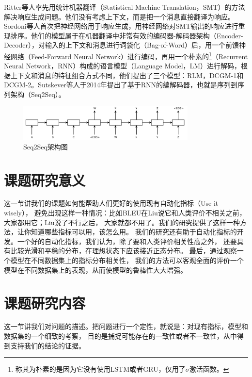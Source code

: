 Ritter等人率先用统计机器翻译（Statistical Machine Translation，SMT）的方法解决响应生成问题。他们没有考虑上下文，而是把一个消息直接翻译为响应。Sordoni等人首次把神经网络用于响应生成，用神经网络对SMT输出的响应进行重现排序。他们的模型属于在机器翻译中非常有效的编码器-解码器架构（Encoder-Decoder），对输入的上下文和消息进行词袋化（Bag-of-Word）后，用一个前馈神经网络（Feed-Forward Neural Network）进行编码，再用一个朴素的\footnote{称其为朴素的是因为它没有使用LSTM或者GRU，仅用了$\sigma$激活函数。}（Recurrent Neural Network，RNN）构成的语言模型（Language Model，LM）进行解码，根据上下文和消息的特征组合方式不同，他们提出了三个模型：RLM，DCGM-1和DCGM-2。Sutskever等人于2014年提出了基于RNN的编解码器，也就是序列到序列架构（Seq2Seq）。

\begin{figure}[H]
    \centering
    \includegraphics[width=0.8\textwidth]{figure/Seq2Seq.png}
    \caption{Seq2Seq架构图}
    \label{fig:Seq2Seq}
\end{figure}

\section{课题研究意义}\label{sec:课题研究意义}
这一节讲我们的课题如何能帮助人们更好的使用现有自动化指标（Use it wisely），
避免出现这样一种情况：比如BLEU在Liu说它和人类评价不相关之前，大家都用它；Liu说了不行之后，
大家就都不用了。我们的研究提供了这样一种方法，让你知道哪些指标可以用，该怎么用。
我们的研究还有助于自动化指标的开发。一个好的自动化指标，我们认为，除了要和人类评价相关性高之外，
还要具有比较光滑和平稳的分布，在理想状态下应该接近正态分布。
最后，通过观察一个模型在不同数据集上的指标分布相关性，
我们的方法可以客观全面的评价一个模型在不同数据集上的表现，从而使模型的鲁棒性大大增强。

\section{课题研究内容}\label{sec:课题研究内容}
这一节讲我们对问题的描述。把问题进行一个定性，就说是：对现有指标，模型和数据集的一个细致的考察，
目的是捕捉可能存在的一致性或者不一致性，从中得到支持我们的结论的证据。

